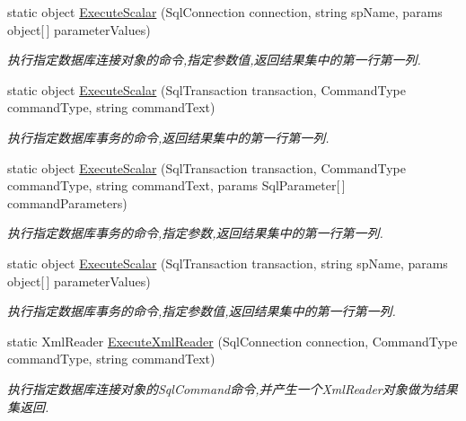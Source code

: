 \begin{DoxyCompactItemize}
static object \hyperlink{class_x_c_l_net_tools_1_1_data_base_1_1_m_s_s_q_l_1_1_sql_helper_aaf9f5a292a70fabb52c9bd779b211792}{Execute\-Scalar} (Sql\-Connection connection, string sp\-Name, params object\mbox{[}$\,$\mbox{]} parameter\-Values)
\begin{DoxyCompactList}\small\item\em 执行指定数据库连接对象的命令,指定参数值,返回结果集中的第一行第一列. \end{DoxyCompactList}\item 
static object \hyperlink{class_x_c_l_net_tools_1_1_data_base_1_1_m_s_s_q_l_1_1_sql_helper_ad623943275683a99359e95c24c93340f}{Execute\-Scalar} (Sql\-Transaction transaction, Command\-Type command\-Type, string command\-Text)
\begin{DoxyCompactList}\small\item\em 执行指定数据库事务的命令,返回结果集中的第一行第一列. \end{DoxyCompactList}\item 
static object \hyperlink{class_x_c_l_net_tools_1_1_data_base_1_1_m_s_s_q_l_1_1_sql_helper_a41b41449491a3e6a42e559393c20d66f}{Execute\-Scalar} (Sql\-Transaction transaction, Command\-Type command\-Type, string command\-Text, params Sql\-Parameter\mbox{[}$\,$\mbox{]} command\-Parameters)
\begin{DoxyCompactList}\small\item\em 执行指定数据库事务的命令,指定参数,返回结果集中的第一行第一列. \end{DoxyCompactList}\item 
static object \hyperlink{class_x_c_l_net_tools_1_1_data_base_1_1_m_s_s_q_l_1_1_sql_helper_aaf67292135b2a2ac864a6cae25af8bec}{Execute\-Scalar} (Sql\-Transaction transaction, string sp\-Name, params object\mbox{[}$\,$\mbox{]} parameter\-Values)
\begin{DoxyCompactList}\small\item\em 执行指定数据库事务的命令,指定参数值,返回结果集中的第一行第一列. \end{DoxyCompactList}\item 
static Xml\-Reader \hyperlink{class_x_c_l_net_tools_1_1_data_base_1_1_m_s_s_q_l_1_1_sql_helper_afd575a331f5cff0ec98a3bc4a84e9960}{Execute\-Xml\-Reader} (Sql\-Connection connection, Command\-Type command\-Type, string command\-Text)
\begin{DoxyCompactList}\small\item\em 执行指定数据库连接对象的\-Sql\-Command命令,并产生一个\-Xml\-Reader对象做为结果集返回. \end{DoxyCompactList}\item 

\end{DoxyCompactItemize}

